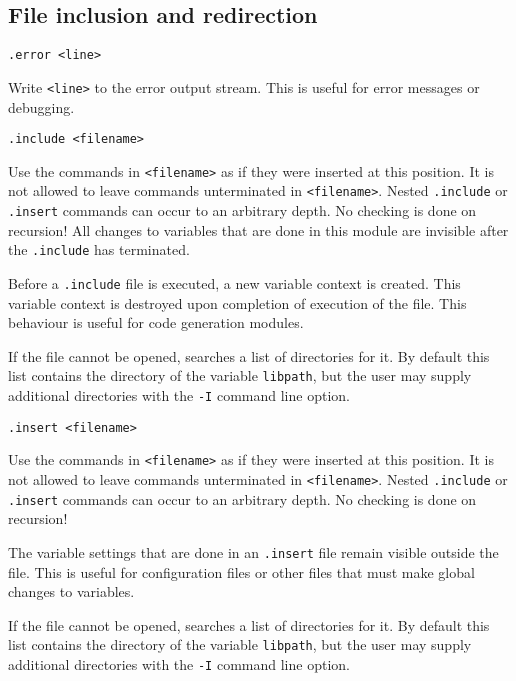 \subsection{File inclusion and redirection}
\begin{verbatim}
.error <line>
\end{verbatim}
\begin{desc}
Write \texttt{<line>} to the error output stream.  This is useful
for error messages or debugging.
\end{desc}
\begin{verbatim}
.include <filename>
\end{verbatim}
\begin{desc}
Use the {\Tm} commands in \texttt{<filename>} as if they were inserted at
this position.
It is not allowed to leave commands unterminated in \texttt{<filename>}.
Nested \texttt{.include} or \texttt{.insert} commands can occur to an arbitrary depth.
No checking is done on recursion!
All changes to variables that are done in this module are invisible after
the \texttt{.include} has terminated.

Before a \verb'.include' file is executed, a new variable context is
created. This variable context is destroyed upon completion of execution
of the file. This behaviour is useful for code generation modules.

If the file cannot be opened, {\Tm} searches a list of directories for it.
By default this list contains the directory of the variable
\verb+libpath+, but the user may supply additional directories with the
\verb+-I+ command line option.
\end{desc}
\begin{verbatim}
.insert <filename>
\end{verbatim}
\begin{desc}
Use the {\Tm} commands in \texttt{<filename>} as if they were inserted at
this position.
It is not allowed to leave commands unterminated in \texttt{<filename>}.
Nested \texttt{.include} or \texttt{.insert}
commands can occur to an arbitrary depth.
No checking is done on recursion!

The variable settings that are done in an \texttt{.insert}
file remain visible outside the file.
This is useful for configuration files or other files that
must make global changes to variables.

If the file cannot be opened, {\Tm} searches a list of directories for it.
By default this list contains the directory of the variable
\verb+libpath+, but the user may supply additional directories with the
\verb+-I+ command line option.
\end{desc}
